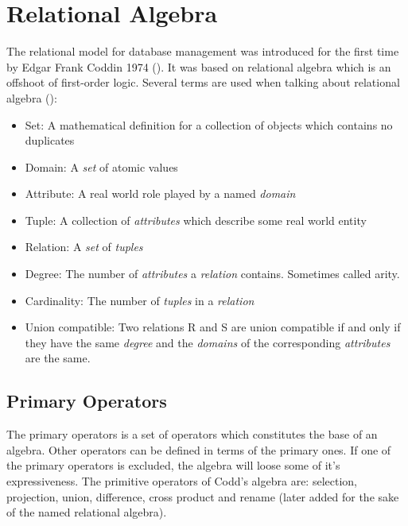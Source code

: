 \section{Relational Algebra}
The relational model for database management was introduced for the first time by Edgar Frank Coddin 1974
(\cite{TDT4225}). It was based on relational algebra which is an offshoot of first-order logic. Several terms are
used when talking about relational algebra (\cite{gordonRussel, newYorkDB, sudarshan}):
\begin{itemize}
\item Set: A mathematical definition for a collection of objects which contains no duplicates
\item Domain: A \textit{set} of atomic values
\item Attribute: A real world role played by a named \textit{domain}
\item Tuple: A collection of \textit{attributes} which describe some real world entity
\item Relation: A \textit{set} of \textit{tuples}
\item Degree: The number of \textit{attributes} a \textit{relation} contains. Sometimes called arity.
\item Cardinality: The number of \textit{tuples} in a \textit{relation}
\item Union compatible: Two relations R and S are union compatible if and only if they have the same
	\textit{degree} and the \textit{domains} of the corresponding \textit{attributes} are the same.
\end{itemize}

\subsection{Primary Operators}
The primary operators is a set of operators which constitutes the base of an algebra. Other operators can be
defined in terms of the primary ones. If one of the primary operators is excluded, the algebra will loose some of
it's expressiveness. The primitive operators of Codd's algebra are: selection, projection, union, difference,
cross product and rename (later added for the sake of the named relational algebra).

